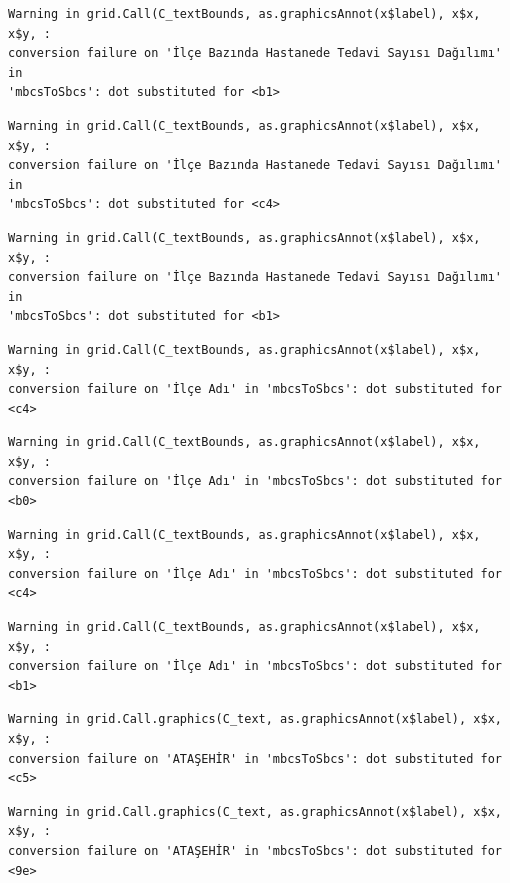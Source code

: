 \documentclass[
  11pt,
  a4paper,
  DIV=11,
  numbers=noendperiod]{scrartcl}
\begin{document}
\begin{verbatim}
Warning in grid.Call(C_textBounds, as.graphicsAnnot(x$label), x$x, x$y, :
conversion failure on 'İlçe Bazında Hastanede Tedavi Sayısı Dağılımı' in
'mbcsToSbcs': dot substituted for <b1>
\end{verbatim}

\begin{verbatim}
Warning in grid.Call(C_textBounds, as.graphicsAnnot(x$label), x$x, x$y, :
conversion failure on 'İlçe Bazında Hastanede Tedavi Sayısı Dağılımı' in
'mbcsToSbcs': dot substituted for <c4>
\end{verbatim}

\begin{verbatim}
Warning in grid.Call(C_textBounds, as.graphicsAnnot(x$label), x$x, x$y, :
conversion failure on 'İlçe Bazında Hastanede Tedavi Sayısı Dağılımı' in
'mbcsToSbcs': dot substituted for <b1>
\end{verbatim}

\begin{verbatim}
Warning in grid.Call(C_textBounds, as.graphicsAnnot(x$label), x$x, x$y, :
conversion failure on 'İlçe Adı' in 'mbcsToSbcs': dot substituted for <c4>
\end{verbatim}

\begin{verbatim}
Warning in grid.Call(C_textBounds, as.graphicsAnnot(x$label), x$x, x$y, :
conversion failure on 'İlçe Adı' in 'mbcsToSbcs': dot substituted for <b0>
\end{verbatim}

\begin{verbatim}
Warning in grid.Call(C_textBounds, as.graphicsAnnot(x$label), x$x, x$y, :
conversion failure on 'İlçe Adı' in 'mbcsToSbcs': dot substituted for <c4>
\end{verbatim}

\begin{verbatim}
Warning in grid.Call(C_textBounds, as.graphicsAnnot(x$label), x$x, x$y, :
conversion failure on 'İlçe Adı' in 'mbcsToSbcs': dot substituted for <b1>
\end{verbatim}

\begin{verbatim}
Warning in grid.Call.graphics(C_text, as.graphicsAnnot(x$label), x$x, x$y, :
conversion failure on 'ATAŞEHİR' in 'mbcsToSbcs': dot substituted for <c5>
\end{verbatim}

\begin{verbatim}
Warning in grid.Call.graphics(C_text, as.graphicsAnnot(x$label), x$x, x$y, :
conversion failure on 'ATAŞEHİR' in 'mbcsToSbcs': dot substituted for <9e>
\end{verbatim}
\end{document}
